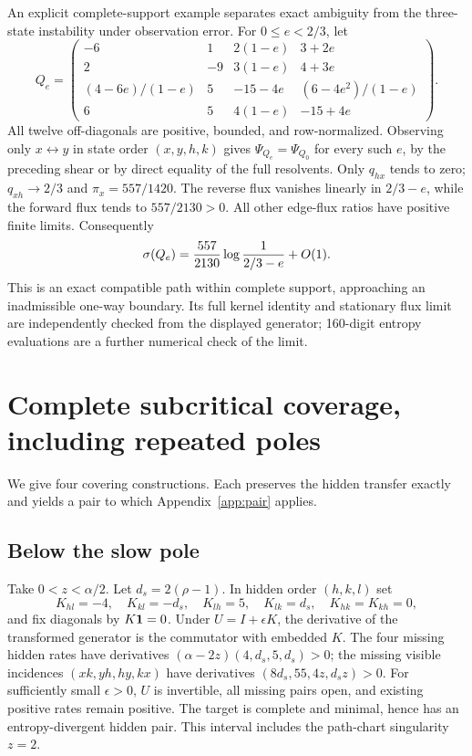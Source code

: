 An explicit complete-support example separates exact ambiguity from the
three-state instability under observation error. For $0\le e<2/3$, let
\begin{equation}
 Q_e=\begin{pmatrix}
 -6&1&2(1-e)&3+2e\\
 2&-9&3(1-e)&4+3e\\
 (4-6e)/(1-e)&5&-15-4e&(6-4e^2)/(1-e)\\
 6&5&4(1-e)&-15+4e
 \end{pmatrix}.\label{eq:complete-four}
\end{equation}
All twelve off-diagonals are positive, bounded, and row-normalized.
Observing only $x\leftrightarrow y$ in state order $(x,y,h,k)$ gives
$\Psi_{Q_e}=\Psi_{Q_0}$ for every such $e$, by the preceding shear or
by direct equality of the full resolvents. Only $q_{hx}$ tends to zero;
$q_{xh}\to2/3$ and $\pi_x=557/1420$. The reverse flux vanishes linearly
in $2/3-e$, while the forward flux tends to $557/2130>0$.
All other edge-flux ratios have positive finite limits. Consequently
\begin{equation}
 \sigma(Q_e)=\frac{557}{2130}\log\frac1{2/3-e}+O(1).
\end{equation}
This is an exact compatible path within complete support, approaching an
inadmissible one-way boundary. Its full kernel identity and stationary
flux limit are independently checked from the displayed generator;
160-digit entropy evaluations are a further numerical check of the limit.

\section{Complete subcritical coverage, including repeated poles}\label{app:subcritical}
We give four covering constructions. Each preserves the hidden transfer exactly and yields a pair to which Appendix~\ref{app:pair} applies.

\subsection{Below the slow pole}
Take $0<z<\alpha/2$. Let $d_s=2(\rho-1)$. In hidden order $(h,k,l)$ set
\begin{equation}
 K_{hl}=-4,\quad K_{kl}=-d_s,\quad K_{lh}=5,\quad K_{lk}=d_s,\quad
 K_{hk}=K_{kh}=0,
\end{equation}
and fix diagonals by $K\mathbf 1=0$. Under $U=I+\epsilon K$, the derivative of the transformed generator is the commutator with embedded $K$. The four missing hidden rates have derivatives $(\alpha-2z)(4,d_s,5,d_s)>0$; the missing visible incidences $(xk,yh,hy,kx)$ have derivatives $(8d_s,55,4z,d_sz)>0$. For sufficiently small $\epsilon>0$, $U$ is invertible, all missing pairs open, and existing positive rates remain positive. The target is complete and minimal, hence has an entropy-divergent hidden pair. This interval includes the path-chart singularity $z=2$.

